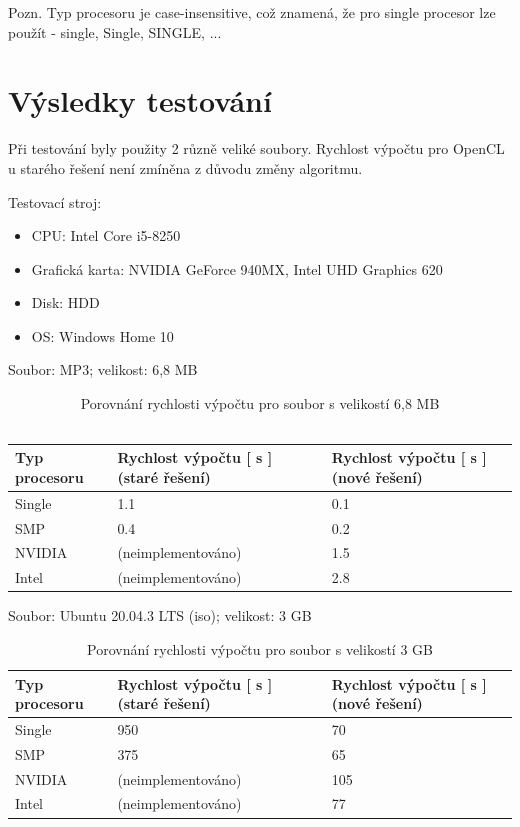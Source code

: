 \documentclass[12pt, a4paper]{article}
\begin{document}
\noindent Pozn. Typ procesoru je case-insensitive, což znamená, že pro single procesor lze použít - single, Single, SINGLE, ...

\newpage
\section{Výsledky testování}
Při testování byly použity 2 různě veliké soubory. Rychlost výpočtu pro OpenCL u starého řešení není zmíněna z důvodu změny algoritmu.

\noindent Testovací stroj:
\begin{itemize}
\item CPU: Intel Core i5-8250
\item Grafická karta: NVIDIA GeForce 940MX, Intel UHD Graphics 620
\item Disk: HDD
\item OS: Windows Home 10\\
\end{itemize}

\noindent Soubor: MP3; velikost: 6,8 MB
\begin{table}[h!]
\centering
\begin{tabular}{ |p{3cm}||p{4cm}|p{4cm}|  }
 \hline
 Typ procesoru& Rychlost výpočtu [ s ] (staré řešení)  & Rychlost výpočtu [ s ] (nové řešení)\\
 \hline
 Single   & 1.1    &0.1\\ 
 SMP &   0.4  & 0.2 \\
 NVIDIA &(neimplementováno) & 1.5\\
 Intel  & (neimplementováno)    &2.8\\
 \hline
\end{tabular}
\caption{Porovnání rychlosti výpočtu pro soubor s velikostí 6,8 MB\\\\}
\end{table}

\noindent Soubor: Ubuntu 20.04.3 LTS (iso); velikost: 3 GB
\begin{table}[h!]
\centering
\begin{tabular}{ |p{3cm}||p{4cm}|p{4cm}|  }
 \hline
 Typ procesoru& Rychlost výpočtu [ s ] (staré řešení)  & Rychlost výpočtu [ s ] (nové řešení)\\
 \hline
 Single   & 950    &70\\ 
 SMP &   375  & 65 \\
 NVIDIA &(neimplementováno) & 105\\
 Intel  & (neimplementováno)    &77\\
 \hline
\end{tabular}
\caption{Porovnání rychlosti výpočtu pro soubor s velikostí 3 GB\\}
\end{table}
\end{document}
